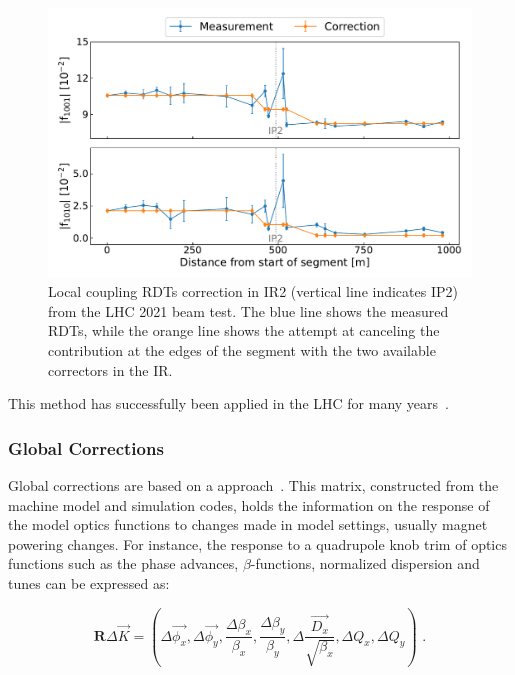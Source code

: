\begin{figure}[!hbt]
  \centering
  \includegraphics*[width=0.99\linewidth]{Figures/Optics_Measurements_Corrections_at_LHC/sbs_coupling_ip2_example.pdf}
  \caption{Local coupling RDTs correction in IR\num{2} (vertical line indicates IP\num{2}) from the LHC \num{2021} beam test. The \textcolor{mplblue}{blue} line shows the measured RDTs, while the \textcolor{mplorange}{orange} line shows the attempt at canceling the contribution at the edges of the segment with the two available correctors in the IR.}
  \label{figure:example_sbs_correction_coupling}
\end{figure}

This method has successfully been applied in the LHC for many years~\cite{PRAB:Aiba:First_Beating_Measurement_LHC,PRAB:Tomas:Record_Low_Beta_Beating_in_the_LHC,PRAB:Persson:LHC_Optics_Commissioning_OnePercent}.

\subsubsection*{Global Corrections}

Global corrections are based on a  approach~\cite{PHD:Vanbavinckhove,EPAC:Tomas:Procedures_Accuracy_Estimates_Beta_Beat_Correction_LHC}.
This matrix, constructed from the machine model and simulation codes, holds the information on the response of the model optics functions to changes made in model settings, usually magnet powering changes.
For instance, the response to a quadrupole \gls{knob} \gls{trim} of optics functions such as the phase advances, \(\beta\)-functions, normalized dispersion and tunes can be expressed as:

\begin{equation}
  \mathbf{R} \Delta \vec{K} = \left(\Delta \overrightarrow{\phi_x}, \Delta \overrightarrow{\phi_y}, \frac{\Delta \beta_x}{\beta_x}, \frac{\Delta \beta_y}{\beta_y}, \Delta \frac{\overrightarrow{D_x}}{\sqrt{\beta_x}}, \Delta Q_x, \Delta Q_y \right) \text{ .}
  \label{equation:response_matrix}
\end{equation}

